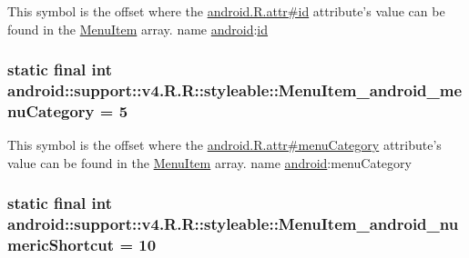 This symbol is the offset where the \hyperlink{}{android.R.attr\#id} attribute's value can be found in the \hyperlink{classandroid_1_1support_1_1v4_1_1_r_1_1styleable_05493a7eeaa2bff09c4fbacbfb671ccc}{MenuItem} array.  name \hyperlink{namespaceandroid}{android}:\hyperlink{classandroid_1_1support_1_1v4_1_1_r_1_1id}{id} \hypertarget{classandroid_1_1support_1_1v4_1_1_r_1_1styleable_4ee75f908e53006cfb8e37bc47033aed}{
\subsubsection[{MenuItem\_\-android\_\-menuCategory}]{\setlength{\rightskip}{0pt plus 5cm}static final int android::support::v4.R.R::styleable::MenuItem\_\-android\_\-menuCategory = 5}}
\label{classandroid_1_1support_1_1v4_1_1_r_1_1styleable_4ee75f908e53006cfb8e37bc47033aed}


This symbol is the offset where the \hyperlink{}{android.R.attr\#menuCategory} attribute's value can be found in the \hyperlink{classandroid_1_1support_1_1v4_1_1_r_1_1styleable_05493a7eeaa2bff09c4fbacbfb671ccc}{MenuItem} array.  name \hyperlink{namespaceandroid}{android}:menuCategory \hypertarget{classandroid_1_1support_1_1v4_1_1_r_1_1styleable_a8c445a29006c1bc48e53880a916394f}{
\subsubsection[{MenuItem\_\-android\_\-numericShortcut}]{\setlength{\rightskip}{0pt plus 5cm}static final int android::support::v4.R.R::styleable::MenuItem\_\-android\_\-numericShortcut = 10}}
\label{classandroid_1_1support_1_1v4_1_1_r_1_1styleable_a8c445a29006c1bc48e53880a916394f}


